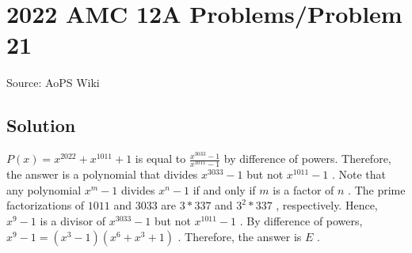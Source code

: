 \documentclass[12pt]{article}
\begin{document}
\section*{{2022 AMC 12A Problems/Problem 21}}
Source: AoPS Wiki

\subsection*{Solution}
$P(x) = x^{2022} + x^{1011} + 1$ is equal to $\frac{x^{3033}-1}{x^{1011}-1}$ by difference of powers. Therefore, the answer is a polynomial that divides $x^{3033}-1$ but not $x^{1011}-1$ . Note that any polynomial $x^m-1$ divides $x^n-1$ if and only if $m$ is a factor of $n$ . The prime factorizations of $1011$ and $3033$ are $3*337$ and $3^2*337$ , respectively. Hence, $x^9-1$ is a divisor of $x^{3033}-1$ but not $x^{1011}-1$ . By difference of powers, $x^9-1=(x^3-1)(x^6+x^3+1)$ .
Therefore, the answer is $\boxed{E}$ .
\end{document}
